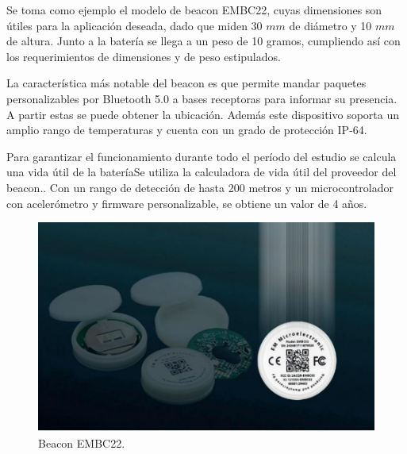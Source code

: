 Se toma como ejemplo el modelo de beacon EMBC22, cuyas dimensiones son útiles para la aplicación deseada, dado que miden 30 $mm$ de diámetro y 10 $mm$ de altura. Junto a la batería se llega a un peso de 10 gramos, cumpliendo así con los requerimientos de dimensiones y de peso estipulados.

La característica más notable del beacon es que permite mandar paquetes personalizables por Bluetooth 5.0 a bases receptoras para informar su presencia. A partir estas se puede obtener la ubicación. Además este dispositivo soporta un amplio rango de temperaturas y cuenta con un grado de protección IP-64.

Para garantizar el funcionamiento durante todo el período del estudio se calcula una vida útil de la batería{Se utiliza la calculadora de vida útil del proveedor del beacon.}. Con un rango de detección de hasta 200 metros y un microcontrolador con acelerómetro y firmware personalizable, se obtiene un valor de 4 años.
\begin{figure}[H]
	\centering
	\includegraphics[width=0.7\linewidth]{ImagenesFactibilidad/beaconpic}
	\caption{Beacon EMBC22.}
	\label{fig:beacon}
\end{figure}

